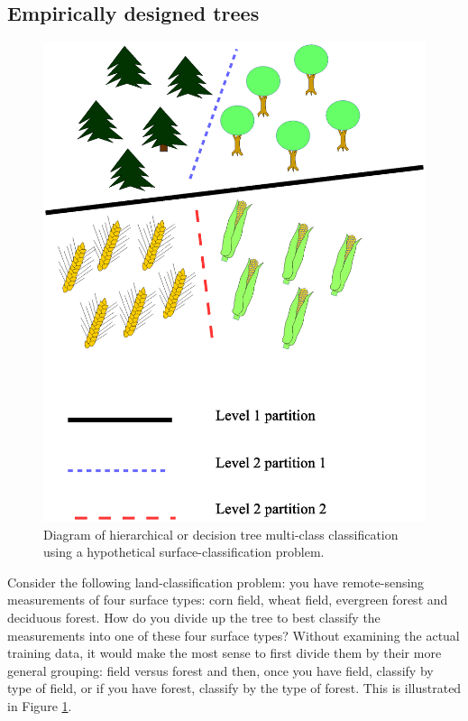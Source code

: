 \subsection{Empirically designed trees}

\label{empirical}

\begin{figure}
	\includegraphics[width=1\textwidth]{landclasstree.eps}
	\caption{Diagram of hierarchical or decision tree multi-class classification using a hypothetical surface-classification problem.}
	\label{landclasstree}
\end{figure}

Consider the following land-classification problem: you have remote-sensing measurements of four surface types: corn field, wheat field, evergreen forest and deciduous forest.
How do you divide up the tree to best classify the measurements into one of these four surface types?
Without examining the actual training data, it would make the most sense to first divide them by their more general grouping: field versus forest and then, once you have field, classify by type of field, or if you have forest, classify by the type of forest.
This is illustrated in Figure \ref{landclasstree}.

